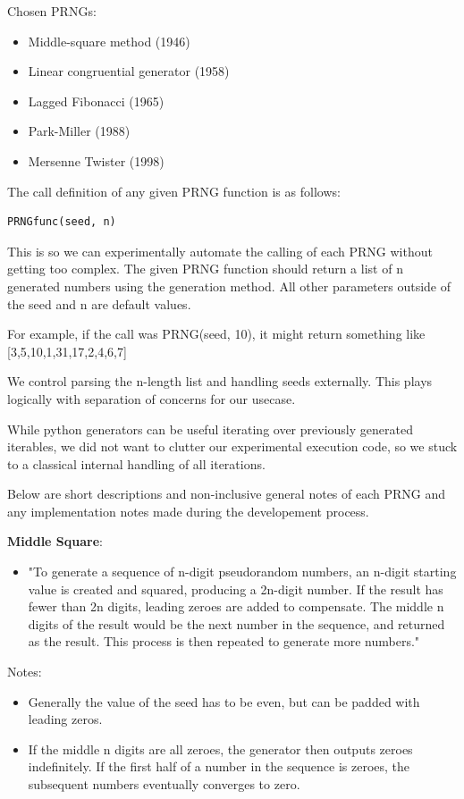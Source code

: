\documentclass[conference]{IEEEtran}
\begin{document}
Chosen PRNGs:
\begin{itemize}
  \item Middle-square method (1946)
  \item Linear congruential generator (1958)
  \item Lagged Fibonacci (1965)
  \item Park-Miller (1988)
  \item Mersenne Twister (1998)
\end{itemize}

The call definition of any given PRNG function is as follows:
\begin{lstlisting}
PRNGfunc(seed, n) 
\end{lstlisting}
This is so we can experimentally automate the calling of each PRNG without getting too complex.
The given PRNG function should return a list of n generated numbers using the generation method.
All other parameters outside of the seed and n are default values.

For example, if the call was PRNG(seed, 10),
it might return something like
[3,5,10,1,31,17,2,4,6,7]

We control parsing the n-length list and handling seeds externally. 
This plays logically with separation of concerns for our usecase.

While python generators can be useful iterating over previously generated iterables,
we did not want to clutter our experimental execution code, so we stuck to a classical
internal handling of all iterations.

Below are short descriptions and non-inclusive general notes of each PRNG and any implementation notes made during the developement process.


\noindent\textbf{Middle Square}:
\begin{itemize}
    \item "To generate a sequence of n-digit pseudorandom numbers, an n-digit starting value is created and squared, producing a 2n-digit number. If the result has fewer than 2n digits, leading zeroes are added to compensate. The middle n digits of the result would be the next number in the sequence, and returned as the result. This process is then repeated to generate more numbers." \cite{MiddleSquare}
\end{itemize}
Notes:
\begin{itemize}
    \item Generally the value of the seed has to be even, but can be padded with leading zeros.
    \item If the middle n digits are all zeroes, the generator then outputs zeroes indefinitely. If the first half of a number in the sequence is zeroes, the subsequent numbers eventually converges to zero.
\end{itemize}
\end{document}
